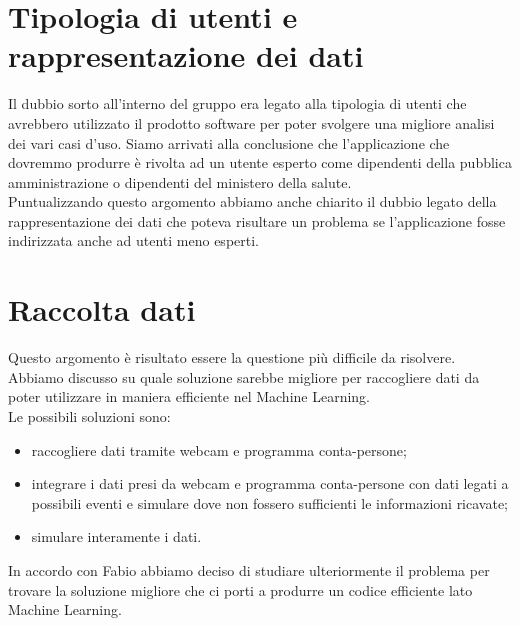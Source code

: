 \section{Tipologia di utenti e rappresentazione dei dati}
Il dubbio sorto all'interno del gruppo era legato alla tipologia di utenti che avrebbero utilizzato il prodotto software per poter svolgere una migliore analisi dei vari casi d'uso. Siamo arrivati alla conclusione che l'applicazione che dovremmo produrre è rivolta ad un utente esperto come dipendenti della pubblica amministrazione o dipendenti del ministero della salute. \\
Puntualizzando questo argomento abbiamo anche chiarito il dubbio legato della rappresentazione dei dati che poteva risultare un problema se l'applicazione fosse indirizzata anche ad utenti meno esperti.
\section{Raccolta dati}
Questo argomento è risultato essere la questione più difficile da risolvere. Abbiamo discusso su quale soluzione sarebbe migliore per raccogliere dati da poter utilizzare in maniera efficiente nel Machine Learning.\\
Le possibili soluzioni sono:
\begin{itemize}
	\item raccogliere dati tramite webcam e programma conta-persone;
	\item integrare i dati presi da webcam e programma conta-persone con dati legati a possibili eventi e simulare dove non fossero sufficienti le informazioni ricavate;
	\item simulare interamente i dati.
\end{itemize}
In accordo con Fabio abbiamo deciso di studiare ulteriormente il problema per trovare la soluzione migliore che ci porti a produrre un codice efficiente lato Machine Learning.